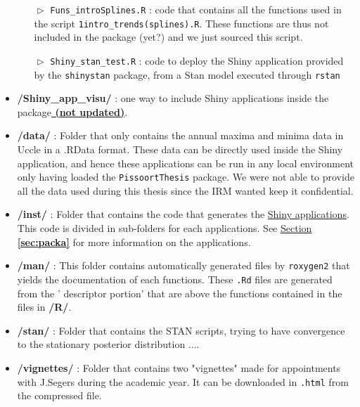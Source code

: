 \begin{itemize}
\begin{itemize}
\item[$\vartriangleright$]\texttt{Funs\_introSplines.R} : code that contains all the functions used in the script \texttt{1intro\_trends(splines).R}. These functions are thus not included in the package (yet?) and we just sourced this script.

\item[$\vartriangleright$]\texttt{Shiny\_stan\_test.R} : code to deploy the Shiny application provided by the \texttt{shinystan} package, from a Stan model executed through \texttt{rstan}

  \end{itemize}


\item \textbf{/Shiny\_app\_visu/} : one way to include Shiny applications inside the package\textbf{\underline{ (not updated)}}.


\item \textbf{/data/} : Folder that only contains the annual maxima and minima data in Uccle in a .RData format. These data can be directly used inside the Shiny application, and hence these applications can be run in any local environment only having loaded the   \texttt{PissoortThesis} package. We were not able to provide all the data used during this thesis since the IRM wanted keep it confidential.

\item \textbf{/inst/} : Folder that contains the code that generates the \underline{Shiny applications}. This code is divided in sub-folders for each applications.  See \hyperref[sec:packa]{Section \textbf{\ref{sec:packa}}} for more information on the applications. 


\item \textbf{/man/} : This folder contains automatically generated files by \texttt{roxygen2} that yields the documentation of each functions. These \texttt{.Rd} files are generated from the ' descriptor portion' that are above the functions contained in the files in \textbf{/R/}.

\item \textbf{/stan/} : Folder that contains the STAN scripts, trying to have convergence to the stationary posterior distribution ....%

\item \textbf{/vignettes/} : Folder that contains two "vignettes" made for appointments with J.Segers during the academic year. It can be downloaded in \texttt{.html} from the compressed file. 


\end{itemize}
